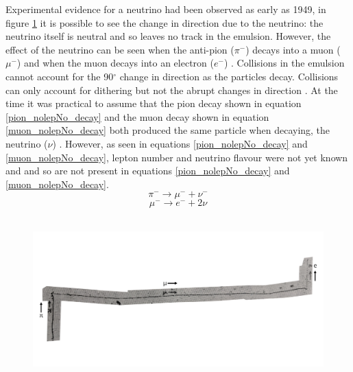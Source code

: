 Experimental evidence for a neutrino had been observed as early as 1949, in figure \ref{pion_path} it is possible to see the change in direction due to the neutrino: the neutrino itself is neutral and so leaves no track in the emulsion. However, the effect of the neutrino can be seen when the anti-pion ($\pi^-$) decays into a muon ($\mu^-$) and when the muon decays into an electron ($e^-$)  \cite{griffiths2008neutrino1.5}. Collisions in the emulsion cannot account for the 90$^\circ$ change in direction as the particles decay. Collisions can only account for dithering but not the abrupt changes in direction  \cite{griffiths2008neutrino1.5}. At the time it was practical to assume that the pion decay shown in equation \ref{pion_nolepNo_decay} and the muon decay shown in equation \ref{muon_nolepNo_decay} both produced the same particle when decaying, the neutrino ($\nu$)  \cite{griffiths2008neutrino1.5}. However, as seen in equations \ref{pion_nolepNo_decay} and \ref{muon_nolepNo_decay}, lepton number and neutrino flavour were not yet known and and so are not present in equations \ref{pion_nolepNo_decay} and \ref{muon_nolepNo_decay}.
\begin{equation}
    \pi^- \rightarrow \mu^- + \nu^-
    \label{pion_nolepNo_decay}
\end{equation}
\begin{equation}
    \mu^- \rightarrow e^- + 2\nu
    \label{muon_nolepNo_decay}
\end{equation}
\\
\begin{figure}[!h]
 \centering
 \includegraphics[width=0.8\linewidth]{Chapter1/Figs/Raster/neutrinoInChamberRotated90.png}
 \label{pion_path}
\end{figure}
